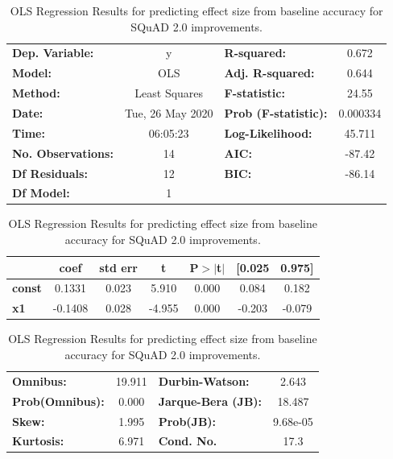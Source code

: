 \documentclass[11pt,a4paper]{article}
\begin{document}
\begin{table}[]
\begin{center}
\begin{tabular}{lclc}
\toprule
\textbf{Dep. Variable:}    &        y         & \textbf{  R-squared:         } &     0.672   \\
\textbf{Model:}            &       OLS        & \textbf{  Adj. R-squared:    } &     0.644   \\
\textbf{Method:}           &  Least Squares   & \textbf{  F-statistic:       } &     24.55   \\
\textbf{Date:}             & Tue, 26 May 2020 & \textbf{  Prob (F-statistic):} &  0.000334   \\
\textbf{Time:}             &     06:05:23     & \textbf{  Log-Likelihood:    } &    45.711   \\
\textbf{No. Observations:} &          14      & \textbf{  AIC:               } &    -87.42   \\
\textbf{Df Residuals:}     &          12      & \textbf{  BIC:               } &    -86.14   \\
\textbf{Df Model:}         &           1      & \textbf{                     } &             \\
\bottomrule
\end{tabular}
\begin{tabular}{lcccccc}
               & \textbf{coef} & \textbf{std err} & \textbf{t} & \textbf{P$> |$t$|$} & \textbf{[0.025} & \textbf{0.975]}  \\
\midrule
\textbf{const} &       0.1331  &        0.023     &     5.910  &         0.000        &        0.084    &        0.182     \\
\textbf{x1}    &      -0.1408  &        0.028     &    -4.955  &         0.000        &       -0.203    &       -0.079     \\
\bottomrule
\end{tabular}
\begin{tabular}{lclc}
\textbf{Omnibus:}       & 19.911 & \textbf{  Durbin-Watson:     } &    2.643  \\
\textbf{Prob(Omnibus):} &  0.000 & \textbf{  Jarque-Bera (JB):  } &   18.487  \\
\textbf{Skew:}          &  1.995 & \textbf{  Prob(JB):          } & 9.68e-05  \\
\textbf{Kurtosis:}      &  6.971 & \textbf{  Cond. No.          } &     17.3  \\
\bottomrule
\end{tabular}
\caption{OLS Regression Results for predicting effect size from baseline accuracy for SQuAD 2.0 improvements.
    \label{tab:olseffectsizesquad}
}
\end{center}
\end{table}
\end{document}
